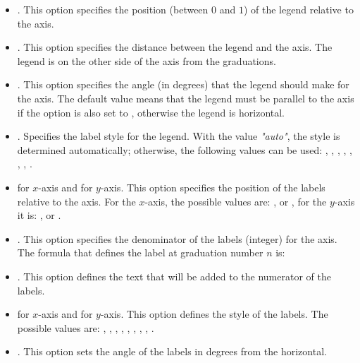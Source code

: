 \begin{itemize}
\begin{itemize}
        \item {}. This option specifies the position (between $0$ and $1$) of the legend relative to the axis.

        \item {}. This option specifies the distance between the legend and the axis. The legend is on the other side of the axis from the graduations.

        \item {}. This option specifies the angle (in degrees) that the legend should make for the axis. The default value  means that the legend must be parallel to the axis if the  option is also set to , otherwise the legend is horizontal.

        \item {}. Specifies the label style for the legend. With the value \emph{"auto"}, the style is determined automatically; otherwise, the following values ​​can be used:  , , , , , , , .

        \item {} for $x$-axis and  for $y$-axis. This option specifies the position of the labels relative to the axis. For the $x$-axis, the possible values ​​are: ,  or , for the $y$-axis it is:  ,  or .

        \item {}. This option specifies the denominator of the labels (integer) for the axis. The formula that defines the label at graduation number $n$ is: 

        \item {}. This option defines the text that will be added to the numerator of the labels.

        \item {} for $x$-axis and  for $y$-axis. This option defines the style of the labels. The possible values ​​are: , , , , , , , , .

        \item {}. This option sets the angle of the labels in degrees from the horizontal.


\end{itemize}
\end{itemize}
